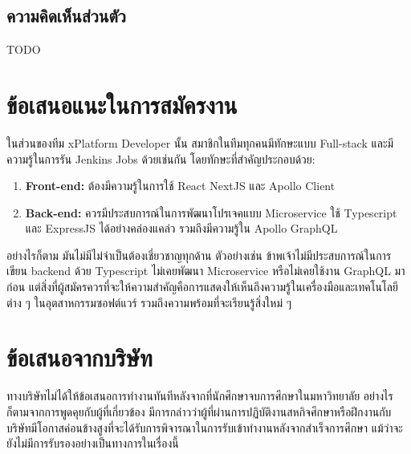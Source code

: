 \subsection{ความคิดเห็นส่วนตัว}
TODO 

\section{ข้อเสนอแนะในการสมัครงาน}
ในส่วนของทีม xPlatform Developer นั้น สมาชิกในทีมทุกคนมีทักษะแบบ Full-stack และมีความรู้ในการรัน Jenkins Jobs ด้วยเช่นกัน โดยทักษะที่สำคัญประกอบด้วย:

\begin{enumerate}
    \item \textbf{Front-end: } ต้องมีความรู้ในการใช้ React NextJS และ Apollo Client
    \item \textbf{Back-end: } ควรมีประสบการณ์ในการพัฒนาโปรเจคแบบ Microservice ใช้ Typescript และ ExpressJS ได้อย่างคล่องแคล่ว รวมถึงมีความรู้ใน Apollo GraphQL
\end{enumerate}

อย่างไรก็ตาม มันไม่มีไม่จำเป็นต้องเชี่ยวชาญทุกด้าน ตัวอย่างเช่น ข้าพเจ้าไม่มีประสบการณ์ในการเขียน backend ด้วย Typescript ไม่เคยพัฒนา Microservice หรือไม่เคยใช้งาน GraphQL มาก่อน แต่สิ่งที่ผู้สมัครควรที่จะให้ความสำคัญคือการแสดงให้เห็นถึงความรู้ในเครื่องมือและเทคโนโลยีต่าง ๆ ในอุตสาหกรรมซอฟต์แวร์ รวมถึงความพร้อมที่จะเรียนรู้สิ่งใหม่ ๆ

\section{ข้อเสนอจากบริษัท}
ทางบริษัทไม่ได้ให้ข้อเสนอการทำงานทันทีหลังจากที่นักศึกษาจบการศึกษาในมหาวิทยาลัย อย่างไรก็ตามจากการพูดคุยกับผู้ที่เกี่ยวข้อง มีการกล่าวว่าผู้ที่ผ่านการปฏิบัติงานสหกิจศึกษาหรือฝึกงานกับบริษัทมีโอกาสค่อนข้างสูงที่จะได้รับการพิจารณาในการรับเข้าทำงานหลังจากสำเร็จการศึกษา แม้ว่าจะยังไม่มีการรับรองอย่างเป็นทางการในเรื่องนี้

